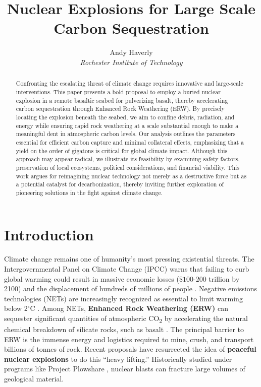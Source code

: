 \documentclass[11pt]{article}
\title{Nuclear Explosions for Large Scale Carbon Sequestration}
\author{Andy Haverly \\
        \textit{Rochester Institute of Technology}}
\begin{document}
\maketitle

\begin{abstract}

Confronting the escalating threat of climate change requires innovative and large-scale interventions. This paper presents a bold proposal to employ a buried nuclear explosion in a remote basaltic seabed for pulverizing basalt, thereby accelerating carbon sequestration through Enhanced Rock Weathering (ERW). By precisely locating the explosion beneath the seabed, we aim to confine debris, radiation, and energy while ensuring rapid rock weathering at a scale substantial enough to make a meaningful dent in atmospheric carbon levels. Our analysis outlines the parameters essential for efficient carbon capture and minimal collateral effects, emphasizing that a yield on the order of gigatons is critical for global climate impact. Although this approach may appear radical, we illustrate its feasibility by examining safety factors, preservation of local ecosystems, political considerations, and financial viability. This work argues for reimagining nuclear technology not merely as a destructive force but as a potential catalyst for decarbonization, thereby inviting further exploration of pioneering solutions in the fight against climate change.





\end{abstract}

\tableofcontents

\section{Introduction}
Climate change remains one of humanity’s most pressing existential
threats. The Intergovernmental Panel on Climate Change (IPCC) warns
that failing to curb global warming could result in massive economic
losses (\(\$100\text{-}200\) trillion by 2100) and the displacement
of hundreds of millions of people \citep{ipcc2018,stern2007,rockstrom2009}.
Negative emissions technologies (NETs) are increasingly recognized as
essential to limit warming below 2$^\circ$C \citep{pacala2004}. Among
NETs, \textbf{Enhanced Rock Weathering (ERW)} can sequester significant
quantities of atmospheric \textsc{CO\textsubscript{2}} by accelerating
the natural chemical breakdown of silicate rocks, such as basalt
\citep{schuiling2006}. The principal barrier to ERW is the immense energy and logistics required to
mine, crush, and transport billions of tonnes of rock. Recent proposals
have resurrected the idea of \textbf{peaceful nuclear explosions} to do
this “heavy lifting.” Historically studied under programs like Project
Plowshare \citep{plowshare1961}, nuclear blasts can fracture large
volumes of geological material.
\end{document}
